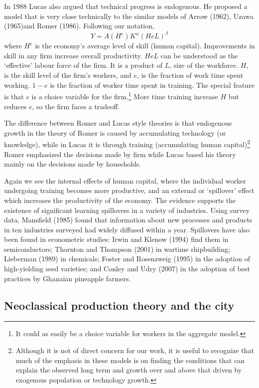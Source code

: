 In 1988 Lucas also argued that technical progress is endogenous. He proposed a model that is very close technically to the similar models of Arrow (1962), Uzawa (1965)and Romer (1986). Following our notation, 
\[ Y = A(H^e) K^\alpha (HeL)^\beta \] 
where $H^e$ is the economy's average level of skill (human capital).  Improvements in skill in any firm  increase overall productivity.  $HeL$  can be understood as the `effective' labour force of the firm. It is a product of $L$, size of the workforce. $H$, is the skill level of the firm's workers, and $e$, is the fraction of work time spent working. $1-e$ is the fraction of worker time  spent in training. The  special feature is that $e$ is a choice variable for the firm.\footnote{It could as easily be a choice variable for workers in the aggregate model.} More time training increase $H$ but reduces $e$, so the firm faces a tradeoff.

The difference between Romer and Lucas style theories is that endogenous growth in the theory of Romer is caused by accumulating technology (or knowledge), while in Lucas it is through training (accumulating human capital)\footnote{Although it is not of direct concern for our work, it is useful to recognize that much of the emphasis in these models is on finding the conditions that can explain the observed long term  and growth over and above that driven by exogenous population or technology growth. } Romer  emphasized the decisions made by firm while Lucas  based his theory mainly on the decisions made by households. 


Again we see the  internal effects of human capital, where the individual worker undergoing training becomes more productive, and an external or `spillover' effect which increases the productivity of the economy. 
The evidence supports the existence of significant learning spillovers in a variety of industries. Using survey data, Mansfield (1985) found that information about new processes and products in ten industries surveyed had widely diffused within a year. Spillovers have also been found in econometric studies: Irwin and Klenow (1994) find them in semiconductors; Thornton and Thompson (2001) in wartime shipbuilding; Lieberman (1989) in chemicals; Foster and Rosenzweig (1995) in the adoption of high-yielding seed varieties; and Conley and Udry (2007) in the adoption of best practices by Ghanaian pineapple farmers. 

\subsection{Neoclassical production theory and the city}

